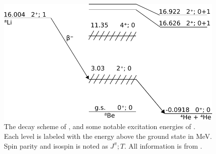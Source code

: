 \begin{figure}
	\centering
	\includegraphics[width=\columnwidth]{../figures/DecayScheme.pdf}
	\caption{The decay scheme of \li, and some notable excitation energies of \ber. Each level is labeled with the energy above the \ber ground state in MeV. Spin parity and isospin is noted as $J^\pi; T$. All information is from \cite{TILLEY2004155}.}
	\label{fig:berStructure}
\end{figure}
